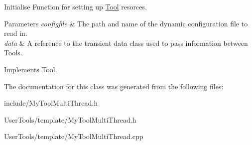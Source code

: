 Initialise Function for setting up \hyperlink{classTool}{Tool} resorces. 


\begin{DoxyParams}{Parameters}
{\em configfile} & The path and name of the dynamic configuration file to read in. \\
\hline
{\em data} & A reference to the transient data class used to pass information between Tools. \\
\hline
\end{DoxyParams}


Implements \hyperlink{classTool_a4b04a99172dfe09dc97927d1feaff0ce}{Tool}.



The documentation for this class was generated from the following files\-:\begin{DoxyCompactItemize}
\item 
include/My\-Tool\-Multi\-Thread.\-h\item 
User\-Tools/template/My\-Tool\-Multi\-Thread.\-h\item 
User\-Tools/template/My\-Tool\-Multi\-Thread.\-cpp\end{DoxyCompactItemize}
